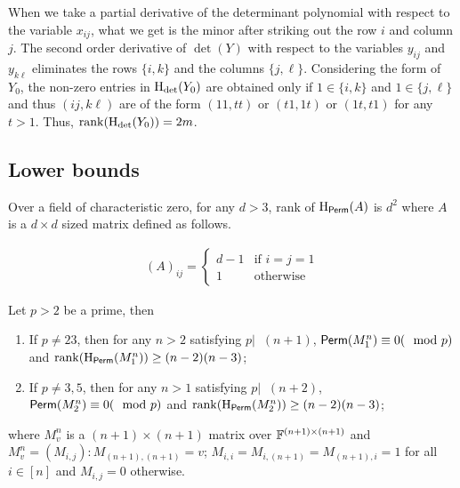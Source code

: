  When we take a  partial derivative of the determinant polynomial with respect to the variable $x_{ij}$, what we get is the minor after striking out the row $i$ and column $j$. 
 The second order derivative of $\det(Y)$ with respect to the variables $y_{ij}$ and $y_{k\ell}$ eliminates the rows $\{i,k\}$ and the columns $\{j,\ell\}$. Considering the form of $Y_0$, the non-zero entries in $\mathrm{H}_{\det}(Y_0)$ are obtained only if $1\in\{i,k\}$ and $1\in\{j,\ell\}$ and thus $(ij,k\ell)$ are of the form $(11,tt)$ or $(t1,1t)$ or $(1t,t1)$ for any $t>1$. Thus, $\mathrm{rank}(\mathrm{H}_{\det}(Y_0)) = 2m$.
 
\subsection{Lower bounds}

\begin{theorem}[\cite{mr04}]
	Over a field of characteristic zero, for any $d>3$, rank of $\mathrm{H}_{\mathsf{Perm}}(A)$ is $d^2$ where $A$ is a $d\times d$ sized matrix defined as follows.
	
	\begin{align*}
		(A)_{ij} = \begin{cases}
			d-1& \mbox{if $i=j=1$}\\
			1& \mbox{otherwise}
		\end{cases}
	\end{align*}
\end{theorem}

\begin{theorem}
	Let $p > 2$ be a prime, then
	\begin{enumerate}
		\item If $p \neq 23$, then for any $n > 2$ satisfying $p\lvert 􏰄􏰄(n+1)$, $\mathsf{Perm}(M^n_1) \equiv 0 (\mod p)$ and $\mathrm{rank}(\mathrm{H}_{\mathsf{Perm}}(M^n_1)) \geq (n-2)(n-3)$;
		\item If $p \neq 3, 5$, then for any $n > 1$ satisfying $p\lvert􏰄􏰄(n + 2)$, $\mathsf{Perm}(M^n_2) \equiv 0 (\mod p)$ and $\mathrm{rank}(\mathrm{H}_{\mathsf{Perm}}(M^n_2)) \geq (n-2)(n-3)$;
	\end{enumerate}
	
	where $M^n_v$ is a $(n+1)\times(n+1)$ matrix over $\mathbb{F}^{(n+1)\times(n+1)}$ and $M^n_v = (M_{i,j}) : M_{(n+1),(n+1)} = v$; $M_{i,i} = M_{i,(n+1)} = M_{(n+1),i} = 1$ for all $i\in[n]$ and $M_{i,j}=0$ otherwise.
	
\end{theorem}

